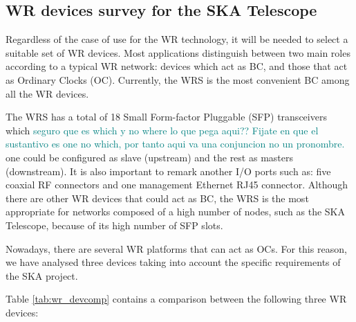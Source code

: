 \subsection{WR devices survey for the SKA Telescope} \label{subsec:wr-dev}

Regardless of the case of use for the WR technology, it will be needed to select
a suitable set of WR devices. Most applications distinguish between two main roles
according to a typical WR network: devices which act as BC, and those that act as
Ordinary Clocks (OC). Currently, the WRS \cite{ohwr:wrs} is the most convenient
BC among all the WR devices. 

The WRS has a total of 18 Small Form-factor Pluggable (SFP) transceivers which 
\textcolor{teal}{seguro que es which y no where lo que pega aqui?? 
Fijate en que el sustantivo es one no which, por tanto aqui va una conjuncion 
no un pronombre.} one could be configured as slave (upstream) and the rest as masters (downstream). It is also important to remark another I/O ports such as: five coaxial RF connectors and one management Ethernet RJ45 connector. Although there are other WR devices that could act as BC, the WRS is the most appropriate for networks composed of a high number of nodes, such as the SKA Telescope, because of its high number of SFP slots.

Nowadays, there  are several WR platforms that can act as OCs. 
For this reason, we have analysed three devices taking into account the specific requirements of the SKA project.

Table \ref{tab:wr_devcomp} contains a comparison between the following three WR
devices: 

